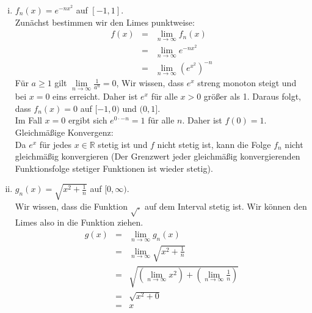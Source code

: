 \documentclass[11pt,a4paper,ngerman]{article}
\newcommand{\limes}[2][n]{\underset{ #1 \rightarrow #2}{\lim}}
\begin{document}
\begin{enumerate}[(i)]
    \item $f_n(x) = e^{-nx^2}$ auf $[-1,1]$.\\ 
        Zunächst bestimmen wir den Limes punktweise:\\
        $$\begin{array}{rcl}
            f(x) &=& \limes{\infty} f_n(x)\\
                &=& \limes{\infty} e^{-nx^2}\\
                &=& \limes{\infty} \left( e^{x^2}\right)^{-n}
        \end{array}$$
        Für $a \geq 1$ gilt $\limes{\infty}\frac{1}{a^n} = 0$,
        Wir wissen, dass $e^x$ streng monoton steigt und bei $x=0$ eins
        erreicht. Daher ist $e^x$ für alle $x>0$ größer als 1.
        Daraus folgt, dass $f_n(x) = 0$ auf $[-1,0)$ und $(0,1]$.\\
        Im Fall $x=0$ ergibt sich $e^{0 \cdot -n} = 1$ für alle $n$.
        Daher ist $f(0) = 1$.\\

        Gleichmäßige Konvergenz:\\
        Da $e^x$ für jedes $x \in \mathbb{R}$ stetig ist und $f$ nicht stetig ist,
        kann die Folge $f_n$ nicht gleichmäßig konvergieren (Der Grenzwert jeder gleichmäßig
        konvergierenden Funktionsfolge stetiger Funktionen ist wieder stetig).

    \item $g_n(x) = \sqrt{x^2 + \frac{1}{n}}$ auf $[0,\infty).$\\
        Wir wissen, dass die Funktion $\sqrt{.}$ auf dem Interval stetig ist.
        Wir können den Limes also in die Funktion ziehen.\\
        $$\begin{array}{rcl}
            g(x) &=& \limes{\infty} g_n(x)\\
                &=& \limes{\infty} \sqrt{x^2 + \frac{1}{n}}\\
                &=& \sqrt{(\limes{\infty} x^2) + (\limes{\infty} \frac{1}{n})}\\
                &=& \sqrt{x^2 + 0}\\
                &=& x
        \end{array}$$


\end{enumerate}
\end{document}
